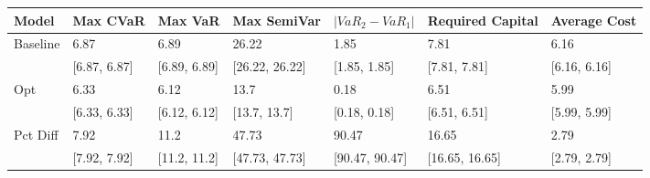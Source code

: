 \begin{tabular}{lllllll}
\toprule
   Model &     Max CVaR &      Max VaR &    Max SemiVar & $|VaR_2 - VaR_1|$ & Required Capital & Average Cost \\
\midrule
Baseline &         6.87 &         6.89 &          26.22 &              1.85 &             7.81 &         6.16 \\
         & [6.87, 6.87] & [6.89, 6.89] & [26.22, 26.22] &      [1.85, 1.85] &     [7.81, 7.81] & [6.16, 6.16] \\
     Opt &         6.33 &         6.12 &           13.7 &              0.18 &             6.51 &         5.99 \\
         & [6.33, 6.33] & [6.12, 6.12] &   [13.7, 13.7] &      [0.18, 0.18] &     [6.51, 6.51] & [5.99, 5.99] \\
Pct Diff &         7.92 &         11.2 &          47.73 &             90.47 &            16.65 &         2.79 \\
         & [7.92, 7.92] & [11.2, 11.2] & [47.73, 47.73] &    [90.47, 90.47] &   [16.65, 16.65] & [2.79, 2.79] \\
\bottomrule
\end{tabular}
